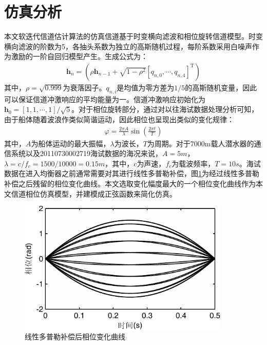 \section{仿真分析}
本文软迭代信道估计算法的仿真信道基于时变横向滤波和相位旋转信道模型。时变横向滤波的阶数为5，各抽头系数为独立的高斯随机过程，每阶系数采用白噪声作为激励的一阶自回归模型产生。生成公式为：
\begin{eqnarray}
    \mathbf{h}_n=(\rho\mathbf{h}_{n-1}+\sqrt{1-\rho^2}[q_{n,0},\cdots,q_{n,4}]^{\mathrm{T}})
    \label{equ:4.29}
\end{eqnarray}
其中，$\rho=\sqrt{0.999}$为衰落因子。$q_{n,i}$是均值为零方差为$1/5$的高斯随机变量，因此可以保证信道冲激响应的平均能量为一。信道冲激响应初始化为$\mathbf{h}_{0}=[1,1,\cdots,1]/\sqrt{5}$。对于相位旋转部分，通过对以往海试数据处理分析可知，由于船体随着波浪作类似简谐运动，因此相位也呈现出类似的变化规律：
\begin{eqnarray}
    \varphi=\frac{2\pi A}{\lambda}\sin(\frac{2\pi t}{T})
    \label{equ:4.30}
\end{eqnarray}
其中，$A$为船体运动的最大振幅，$\lambda$为波长，$T$为周期。对于7000m载人潜水器的通信系统以及20110730002719海试数据的海况来说，$A=5m$，$\lambda=c/f_c=1500/10000=0.15m$，其中，$c$为声速，$f_c$为载波频率，$T=10s$。海试数据在进入均衡器之前通常需要对其进行线性多普勒补偿，图\ref{fig:4.3}为经过线性多普勒补偿之后残留的相位变化曲线。本文选取变化幅度最大的一个相位变化曲线作为本文信道相位仿真模型，并建模成正弦函数来简化仿真。
\begin{figure}[htb]
  \begin{center}
    \includegraphics[width=0.9\textwidth]{images/phase_diff.pdf}
  \end{center}
  \caption{线性多普勒补偿后相位变化曲线}
  \label{fig:4.3}
\end{figure}

